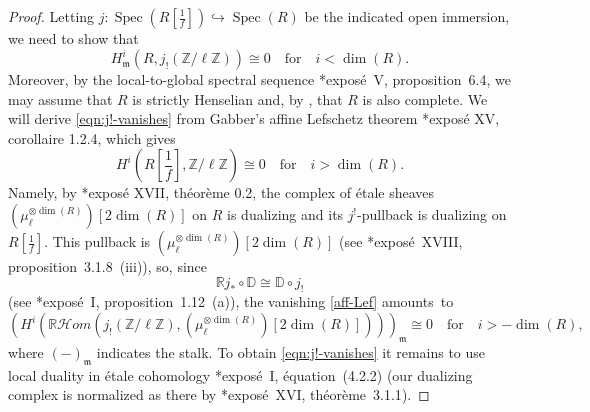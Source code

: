 \documentclass[11pt, reqno]{amsart}
\newcommand{\temp}[1]{{\color{Gray} {\footnotesize  #1 }}}			%
\newcommand{\bD}{\mathbb{D}}
\newcommand{\bR}{\mathbb{R}}
\newcommand{\bZ}{\mathbb{Z}}
\newcommand{\fm}{\mathfrak{m}}
\newcommand{\sH}{\mathscr{H}}
\DeclareMathOperator{\Spec}{Spec}		%
\newcommand{\hra}{\hookrightarrow}
\providecommand{\p}[1]{\left(#1\right)}
\newcommand{\tensor}{\otimes} 			%
\providecommand{\f}[2]{\frac{#1}{#2}}
\newcommand{\blem}{\begin{lemma}}
\newcommand{\elem}{\end{lemma}}
\newcommand{\lab}{\label}
\newcommand{\x}{\text}
\newcommand{\q}{\quad}
\newcommand{\tst}{\textstyle}
\newcommand{\be}{\begin{equation}}
\newcommand{\ee}{\end{equation}}
\newcommand{\bpf}{\begin{proof}}
\newcommand{\epf}{\end{proof}}
\numberwithin{equation}{numberingbase}
\theoremstyle{thms}
\newtheorem{lemma}[numberingbase]{Lemma}
\theoremstyle{claims}
\theoremstyle{defs}
\theoremstyle{thms}
\theoremstyle{defs}
\theoremstyle{subsection-tweak}
\theoremstyle{subsection-tweak}
\begin{document}
\bpf
Letting $j \colon \Spec(R[\f{1}{f}]) \hra \Spec(R)$ be the indicated open immersion, we need to show that
\be \label{eqn:j!-vanishes}
H^i_{\fm}(R, j_!(\bZ/\ell \bZ)) \cong 0 \q \x{for} \q i < \dim(R).
\ee
Moreover, by the local-to-global spectral sequence \cite{SGA4II}*{expos\'{e}~V, proposition~6.4}, we may assume that $R$ is strictly Henselian and, by , that $R$ is also complete. We will derive \eqref{eqn:j!-vanishes} from Gabber's affine Lefschetz theorem \cite{ILO14}*{expos\'{e} XV, corollaire 1.2.4}, which gives
\be \lab{aff-Lef}
\tst H^i(R[\f{1}{f}], \bZ/\ell\bZ) \cong 0 \q \x{for} \q i > \dim(R).
\ee
Namely, by %
\cite{ILO14}*{expos\'{e} XVII, th\'{e}or\`{e}me 0.2}, the complex of \'{e}tale sheaves $(\mu_\ell^{\tensor \dim(R)})[2\dim(R)]$  on $R$ is dualizing and its $j^!$-pullback is dualizing on $R[\f{1}{f}]$. This pullback is $(\mu_\ell^{\tensor \dim(R)})[2\dim(R)]$ (see \cite{SGA4III}*{expos\'{e}~XVIII, proposition~3.1.8~(iii)}), so, since 
\[
\bR j_* \circ \bD \cong \bD \circ j_!
\]
(see \cite{SGA5}*{expos\'{e}~I, proposition~1.12~(a)}), the vanishing \eqref{aff-Lef} amounts~to
\[
\tst \p{H^{i}\p{\bR\sH om\p{j_!(\bZ/\ell \bZ), (\mu_\ell^{\tensor \dim(R)})[2\dim(R)]}}}_{\fm} \cong 0 \q \text{for} \q i > -\dim(R),
\]
where $(-)_{\fm}$ indicates the stalk. To obtain \eqref{eqn:j!-vanishes} it remains to use local duality in \'{e}tale cohomology \cite{SGA5}*{expos\'{e}~I, \'{e}quation~(4.2.2)} (our dualizing complex is normalized %
as there by \cite{ILO14}*{expos\'{e}~XVI, th\'{e}or\`{e}me~3.1.1}). %
\epf
















\end{document}
